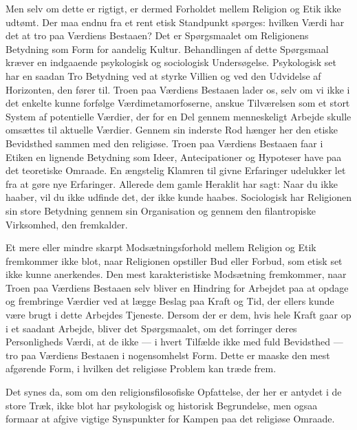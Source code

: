 \documentclass[12pt,a4paper]{article}
\newcommand{\opage}[1]{\marginnote{\footnotesize\textit{[#1]}}}
\begin{document}
Men selv om dette er rigtigt, er dermed Forholdet mellem Religion og Etik ikke
udtømt. Der maa endnu fra et rent etisk Standpunkt spørges: hvilken Værdi har
det at tro paa Værdiens Bestaaen? Det er Spørgsmaalet om Religionens Betydning
som Form for aandelig Kultur. Behandlingen af dette Spørgsmaal kræver en
indgaaende psykologisk og sociologisk Undersøgelse. Psykologisk set har en
saadan Tro Betydning ved at styrke Villien og ved den Udvidelse af Horizonten,
den fører til. Troen paa Værdiens Bestaaen lader os, selv om vi ikke i det
enkelte kunne forfølge Værdimetamorfoserne, anskue Tilværelsen som et stort
System af potentielle Værdier, der for en Del gennem menneskeligt Arbejde
skulle omsættes til aktuelle Værdier. Gennem sin inderste Rod hænger her den
etiske Bevidsthed sammen med den religiøse. Troen paa Værdiens Bestaaen faar i
Etiken en lignende Betydning som Ideer, Antecipationer og Hypoteser have paa
det teoretiske Omraade. En ængstelig Klamren til givne Erfaringer udelukker let
fra at gøre nye Erfaringer. Allerede dem gamle Heraklit har sagt: Naar du ikke
haaber, vil du ikke udfinde det, der ikke kunde haabes. Sociologisk har
Religionen sin store Betydning gennem sin Organisation og gennem den
filantropiske Virksomhed, den fremkalder.

Et mere eller mindre skarpt Modsætningsforhold mellem Religion og Etik
fremkommer ikke blot, naar Religionen opstiller Bud eller Forbud, som etisk set
ikke kunne anerkendes. Den mest karakteristiske Modsætning fremkommer, naar
Troen paa Værdiens Bestaaen selv bliver en Hindring for Arbejdet paa
\opage{421} at opdage og frembringe Værdier ved at lægge Beslag paa Kraft og Tid, der
ellers kunde være brugt i dette Arbejdes Tjeneste. Dersom der er dem, hvis hele
Kraft gaar op i et saadant Arbejde, bliver det Spørgsmaalet, om det forringer
deres Personligheds Værdi, at de ikke --- i hvert Tilfælde ikke med fuld
Bevidsthed --- tro paa Værdiens Bestaaen i nogensomhelst Form. Dette er maaske
den mest afgørende Form, i hvilken det religiøse Problem kan træde frem.

Det synes da, som om den religionsfilosofiske Opfattelse, der her er antydet i
de store Træk, ikke blot har psykologisk og historisk Begrundelse, men ogsaa
formaar at afgive vigtige Synspunkter for Kampen paa det religiøse Omraade.
\end{document}
